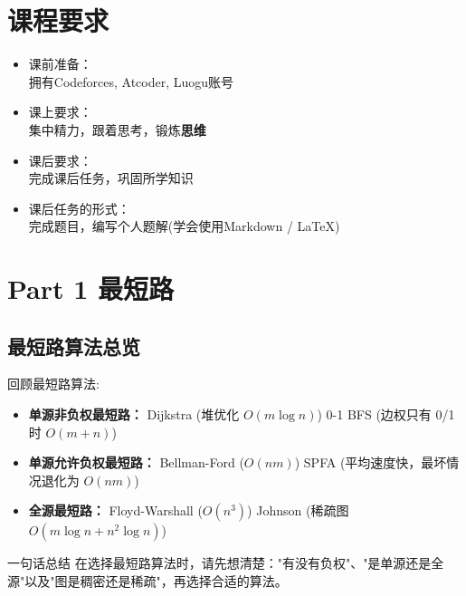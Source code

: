 \documentclass[11pt]{beamer}
\begin{document}
\section{课程要求}
\begin{frame}
    \begin{itemize}
    \item 课前准备：\\
    拥有Codeforces, Atcoder, Luogu账号\\
    \item 课上要求：\\
    集中精力，跟着思考，锻炼\textbf{思维} \\
    \item 课后要求：\\
    完成课后任务，巩固所学知识\\
    \item 课后任务的形式：\\
    完成题目，编写个人题解(学会使用Markdown / \LaTeX)\\
    \end{itemize}
\end{frame}

\section{Part 1 最短路}
\subsection{最短路算法总览}
\begin{frame}
    回顾最短路算法:
    \begin{itemize}
        \item \textbf{单源非负权最短路：}
        Dijkstra (堆优化 $O(m \log n)$)
        0-1 BFS (边权只有 0/1 时 $O(m+n)$)
        \item \textbf{单源允许负权最短路：}
        Bellman-Ford ($O(nm)$)
        SPFA (平均速度快，最坏情况退化为 $O(nm)$)
        \item \textbf{全源最短路：}
        Floyd-Warshall ($O(n^3)$)
        Johnson (稀疏图 $O(m \log n + n^2 \log n)$)
    \end{itemize}
    \begin{block}{一句话总结}
        在选择最短路算法时，请先想清楚："有没有负权"、"是单源还是全源"以及"图是稠密还是稀疏"，再选择合适的算法。
    \end{block}
\end{frame}
\end{document}
